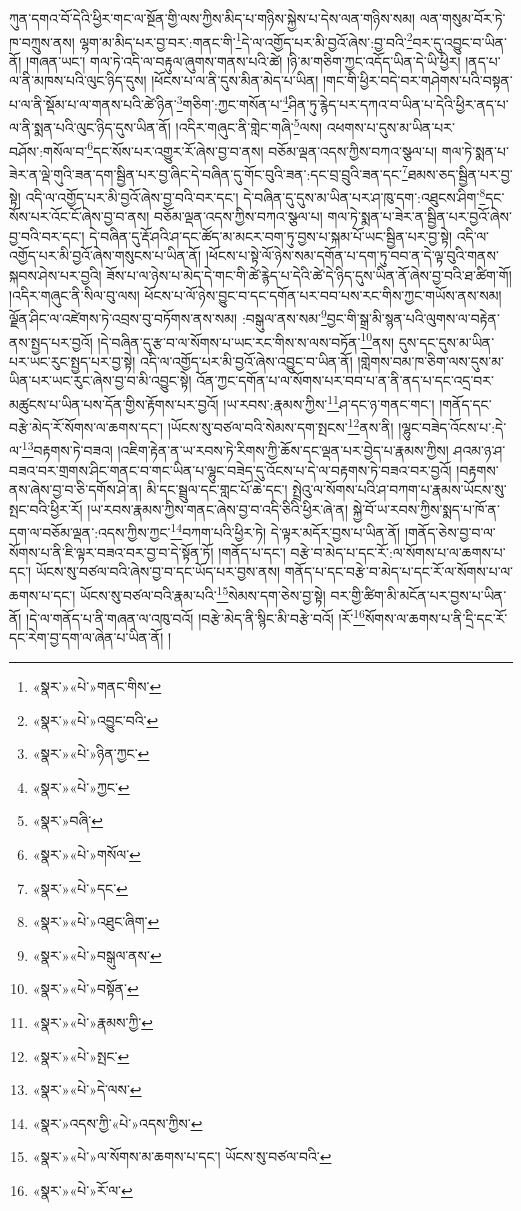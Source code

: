 ཀུན་དགའ་བོ་དེའི་ཕྱིར་གང་ལ་སྔོན་གྱི་ལས་ཀྱིས་མིད་པ་གཉིས་སྐྱེས་པ་དེས་ལན་གཉིས་སམ། ལན་གསུམ་བོར་ཏེ་ཁ་བཀྲུས་ནས། ལྷག་མ་མིད་པར་བྱ་བར་:གནང་གི་\footnote{«སྣར་»«པེ་»གནང་གིས་}དེ་ལ་འགྱོད་པར་མི་བྱའོ་ཞེས་:བྱ་བའི་\footnote{«སྣར་»«པེ་»འབྱུང་བའི་}བར་དུ་འབྱུང་བ་ཡིན་ནོ། །གཞན་ཡང་། གལ་ཏེ་འདི་ལ་བརྟུལ་ཞུགས་གནས་པའི་ཚེ། །ཉི་མ་གཅིག་ཀྱང་འདོད་ཡིན་དེ་ཡི་ཕྱིར། །ནད་པ་ལ་ནི་མཁས་པའི་ལུང་ཉིད་དུས། །ཕོངས་པ་ལ་ནི་དུས་མིན་མེད་པ་ཡིན། །གང་གི་ཕྱིར་བདེ་བར་གཤེགས་པའི་བསྟན་པ་ལ་ནི་སྡོམ་པ་ལ་གནས་པའི་ཚེ་ཉིན་\footnote{«སྣར་»«པེ་»ཉིན་ཀྱང་}གཅིག་:ཀྱང་གསོན་པ་\footnote{«སྣར་»«པེ་»ཀྱང་}ཤིན་ཏུ་རྙེད་པར་དཀའ་བ་ཡིན་པ་དེའི་ཕྱིར་ནད་པ་ལ་ནི་སྨན་པའི་ལུང་ཉིད་དུས་ཡིན་ནོ། །འདིར་གཞུང་ནི་གླེང་གཞི་\footnote{«སྣར་»བཞི་}ལས། འཕགས་པ་དུས་མ་ཡིན་པར་བཤོས་:གསོལ་བ་\footnote{«སྣར་»«པེ་»གསོལ་}དང་སོས་པར་འགྱུར་རོ་ཞེས་བྱ་བ་ནས། བཅོམ་ལྡན་འདས་ཀྱིས་བཀའ་སྩལ་པ། གལ་ཏེ་སྨན་པ་ཟེར་ན་ལྡེ་གུའི་ཟན་དག་སྦྱིན་པར་བྱ་ཞིང་དེ་བཞིན་དུ་གོང་བུའི་ཟན་:དང་བྲ་བྲུའི་ཟན་དང་\footnote{«སྣར་»«པེ་»དང་}ཐམས་ཅད་སྦྱིན་པར་བྱ་སྟེ། འདི་ལ་འགྱོད་པར་མི་བྱའོ་ཞེས་བྱ་བའི་བར་དང་། དེ་བཞིན་དུ་དུས་མ་ཡིན་པར་ཤ་ཁུ་དག་:འཐུངས་ཤིག་\footnote{«སྣར་»«པེ་»འཐུང་ཞིག་}དང་སོས་པར་འོང་ངོ་ཞེས་བྱ་བ་ནས། བཅོམ་ལྡན་འདས་ཀྱིས་བཀའ་སྩལ་པ། གལ་ཏེ་སྨན་པ་ཟེར་ན་སྦྱིན་པར་བྱའོ་ཞེས་བྱ་བའི་བར་དང་། དེ་བཞིན་དུ་རྡོ་ཤའི་ཤ་དང་ཚོད་མ་མངར་བག་ཏུ་བྱས་པ་སྐམ་པོ་ཡང་སྦྱིན་པར་བྱ་སྟེ། འདི་ལ་འགྱོད་པར་མི་བྱའོ་ཞེས་གསུངས་པ་ཡིན་ནོ། །ཕོངས་པ་སྟེ་ལོ་ཉེས་སམ་དགོན་པ་དག་ཏུ་བབ་ན་དེ་ལྟ་བུའི་གནས་སྐབས་ཤེས་པར་བྱའི། ཟོས་པ་ལ་ཉེས་པ་མེད་དེ་གང་གི་ཚེ་རྙེད་པ་དེའི་ཚེ་དེ་ཉིད་དུས་ཡིན་ནོ་ཞེས་བྱ་བའི་ཐ་ཚིག་གོ། །འདིར་གཞུང་ནི་སིལ་བུ་ལས། ཕོངས་པ་ལོ་ཉེས་བྱུང་བ་དང་དགོན་པར་བབ་པས་རང་གིས་ཀྱང་གཡོས་ནས་སམ། ལྗོན་ཤིང་ལ་འཛེགས་ཏེ་འབྲས་བུ་བཏོགས་ནས་སམ། :བསྒུལ་ནས་སམ་\footnote{«སྣར་»«པེ་»བསྒུལ་ནས་}བྱང་གི་སྒྲ་མི་སྙན་པའི་ལུགས་ལ་བརྟེན་ནས་སྤྱད་པར་བྱའོ། །དེ་བཞིན་དུ་རྩ་བ་ལ་སོགས་པ་ཡང་རང་གིས་ས་ལས་བཏོན་\footnote{«སྣར་»«པེ་»བསྟོན་}ནས། དུས་དང་དུས་མ་ཡིན་པར་ཡང་རུང་སྤྱད་པར་བྱ་སྟེ། འདི་ལ་འགྱོད་པར་མི་བྱའོ་ཞེས་འབྱུང་བ་ཡིན་ནོ། །གླེགས་བམ་ཁ་ཅིག་ལས་དུས་མ་ཡིན་པར་ཡང་རུང་ཞེས་བྱ་བ་མི་འབྱུང་སྟེ། འོན་ཀྱང་དགོན་པ་ལ་སོགས་པར་བབ་པ་ན་ནི་ནད་པ་དང་འདྲ་བར་མཚུངས་པ་ཡིན་པས་དོན་གྱིས་རྟོགས་པར་བྱའོ། །ཡ་རབས་:རྣམས་ཀྱིས་\footnote{«སྣར་»«པེ་»རྣམས་ཀྱི་}ཤ་དང་ཉ་གནང་གང་། །གནོད་དང་བརྩེ་མེད་རོ་སོགས་ལ་ཆགས་དང་། །ཡོངས་སུ་བཙལ་བའི་སེམས་དག་སྤངས་\footnote{«སྣར་»«པེ་»སྤང་}ནས་ནི། །ལྷུང་བཟེད་འོངས་པ་:དེ་ལ་\footnote{«སྣར་»«པེ་»དེ་ལས་}བརྟགས་ཏེ་བཟའ། །འཇིག་རྟེན་ན་ཡ་རབས་ཏེ་རིགས་ཀྱི་ཆོས་དང་ལྡན་པར་བྱེད་པ་རྣམས་ཀྱིས། ཤའམ་ཉ་ཤ་བཟའ་བར་གྲགས་ཤིང་གནང་བ་གང་ཡིན་པ་ལྷུང་བཟེད་དུ་འོངས་པ་དེ་ལ་བརྟགས་ཏེ་བཟའ་བར་བྱའོ། །བརྟགས་ནས་ཞེས་བྱ་བ་ཅི་དགོས་ཤེ་ན། མི་དང་སྦྲུལ་དང་གླང་པོ་ཆེ་དང་། སྤྲེའུ་ལ་སོགས་པའི་ཤ་བཀག་པ་རྣམས་ཡོངས་སུ་སྤང་བའི་ཕྱིར་རོ། །ཡ་རབས་རྣམས་ཀྱིས་གནང་ཞེས་བྱ་བ་འདི་ཅིའི་ཕྱིར་ཞེ་ན། སྐྱེ་བོ་ཡ་རབས་ཀྱིས་སྨད་པ་ཁོ་ན་དག་ལ་བཅོམ་ལྡན་:འདས་ཀྱིས་ཀྱང་\footnote{«སྣར་»འདས་ཀྱི་«པེ་»འདས་ཀྱིས་}བཀག་པའི་ཕྱིར་ཏེ། དེ་ལྟར་མདོར་བྱས་པ་ཡིན་ནོ། །གནོད་ཅེས་བྱ་བ་ལ་སོགས་པ་ནི་ཇི་ལྟར་བཟའ་བར་བྱ་བ་དེ་སྟོན་ཏོ། །གནོད་པ་དང་། བརྩེ་བ་མེད་པ་དང་རོ་:ལ་སོགས་པ་ལ་ཆགས་པ་དང་། ཡོངས་སུ་བཙལ་བའི་ཞེས་བྱ་བ་དང་ཡོད་པར་བྱས་ནས། གནོད་པ་དང་བརྩེ་བ་མེད་པ་དང་རོ་ལ་སོགས་པ་ལ་ཆགས་པ་དང་། ཡོངས་སུ་བཙལ་བའི་རྣམ་པའི་\footnote{«སྣར་»«པེ་»ལ་སོགས་མ་ཆགས་པ་དང་། ཡོངས་སུ་བཙལ་བའི་}སེམས་དག་ཅེས་བྱ་སྟེ། བར་གྱི་ཚིག་མི་མངོན་པར་བྱས་པ་ཡིན་ནོ། །དེ་ལ་གནོད་པ་ནི་གཞན་ལ་འཁུ་བའོ། །བརྩེ་མེད་ནི་སྙིང་མི་བརྩེ་བའོ། །རོ་\footnote{«སྣར་»«པེ་»རོ་ལ་}སོགས་ལ་ཆགས་པ་ནི་དྲི་དང་རོ་དང་རེག་བྱ་དག་ལ་ཞེན་པ་ཡིན་ནོ། །
